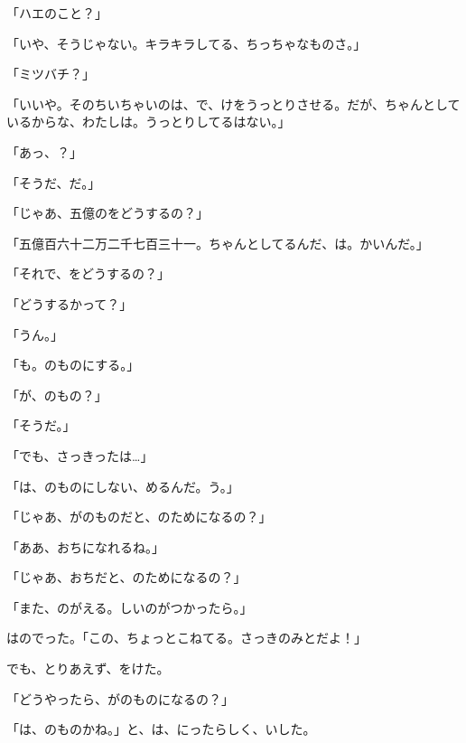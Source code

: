 「ハエのこと？」

「いや、そうじゃない。キラキラしてる、ちっちゃなものさ。」

「ミツバチ？」

「いいや。そのちいちゃいのは、で、けをうっとりさせる。だが、ちゃんとしているからな、わたしは。うっとりしてるはない。」

「あっ、？」

「そうだ、だ。」

「じゃあ、五億のをどうするの？」

「五億百六十二万二千七百三十一。ちゃんとしてるんだ、は。かいんだ。」

「それで、をどうするの？」

「どうするかって？」

「うん。」

「も。のものにする。」

「が、のもの？」

「そうだ。」

「でも、さっきったは…」

「は、のものにしない、めるんだ。う。」

「じゃあ、がのものだと、のためになるの？」

「ああ、おちになれるね。」

「じゃあ、おちだと、のためになるの？」

「また、のがえる。しいのがつかったら。」

はのでった。「この、ちょっとこねてる。さっきのみとだよ！」

でも、とりあえず、をけた。

「どうやったら、がのものになるの？」

「は、のものかね。」と、は、にったらしく、いした。

